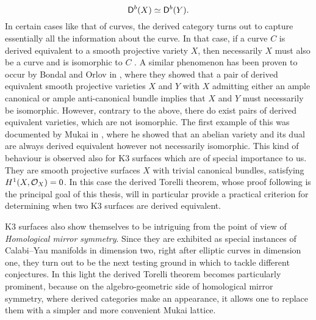 \[
    \mathsf{D}^b(X) \simeq \mathsf{D}^b(Y). 
\]
In certain cases like that of curves, the derived category turns out to capture essentially all the information about the curve. In that case, if a curve $C$ is derived equivalent to a smooth projective variety $X$, then necessarily $X$ must also be a curve and is isomorphic to $C$ \cite[\S 5]{huybrechts2006fouriermukai}. A similar phenomenon has been proven to occur by Bondal and Orlov in \cite{BondalOrlov2001}, where they showed that a pair of derived equivalent smooth projective varieties $X$ and $Y$ with $X$ admitting either an ample canonical or ample anti-canonical bundle implies that $X$ and $Y$ must necessarily be isomorphic. However, contrary to the above, there do exist pairs of derived equivalent varieties, which are not isomorphic. The first example of this was documented by Mukai in \cite{Mukai1981}, where he showed that an abelian variety and its dual are always derived equivalent however not necessarily isomorphic. This kind of behaviour is observed also for K3 surfaces which are of special importance to us. They are smooth projective surfaces $X$ with trivial canonical bundles, satisfying $H^{1}(X, {\mathcal{O}_{X}}) = 0$. In this case the derived Torelli theorem, whose proof following \cite{Orlov2003} is the principal goal of this thesis, will in particular provide a practical criterion for determining when two K3 surfaces are derived equivalent. 


K3 surfaces also show themselves to be intriguing from the point of view of \emph{Homological mirror symmetry}. Since they are exhibited as special instances of Calabi--Yau manifolds in dimension two, right after elliptic curves in dimension one, they turn out to be the next testing ground in which to tackle different conjectures. In this light the derived Torelli theorem becomes particularly prominent, because on the algebro-geometric side of homological mirror symmetry, where derived categories make an appearance, it allows one to replace them with a simpler and more convenient Mukai lattice. 





